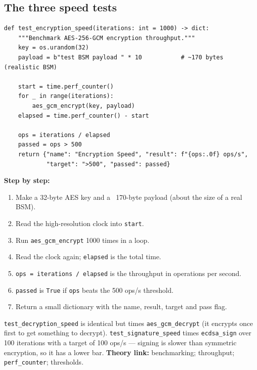 \documentclass[11pt,a4paper]{report}
\begin{document}
\subsection{The three speed tests}
\begin{lstlisting}[style=py,caption={evaluate\_security.py --- a representative speed benchmark.}]
def test_encryption_speed(iterations: int = 1000) -> dict:
    """Benchmark AES-256-GCM encryption throughput."""
    key = os.urandom(32)
    payload = b"test BSM payload " * 10           # ~170 bytes (realistic BSM)

    start = time.perf_counter()
    for _ in range(iterations):
        aes_gcm_encrypt(key, payload)
    elapsed = time.perf_counter() - start

    ops = iterations / elapsed
    passed = ops > 500
    return {"name": "Encryption Speed", "result": f"{ops:.0f} ops/s",
            "target": ">500", "passed": passed}
\end{lstlisting}
\textbf{Step by step:}
\begin{enumerate}
  \item Make a 32-byte AES key and a ~170-byte payload (about the size of a real
        BSM).
  \item Read the high-resolution clock into \texttt{start}.
  \item Run \texttt{aes\_gcm\_encrypt} 1000 times in a loop.
  \item Read the clock again; \texttt{elapsed} is the total time.
  \item \texttt{ops = iterations / elapsed} is the throughput in operations per
        second.
  \item \texttt{passed} is \texttt{True} if \texttt{ops} beats the 500 ops/s
        threshold.
  \item Return a small dictionary with the name, result, target and pass flag.
\end{enumerate}
\texttt{test\_decryption\_speed} is identical but times \texttt{aes\_gcm\_decrypt}
(it encrypts once first to get something to decrypt). \texttt{test\_signature\_speed}
times \texttt{ecdsa\_sign} over 100 iterations with a target of 100 ops/s ---
signing is slower than symmetric encryption, so it has a lower bar.
\textbf{Theory link:} benchmarking; throughput; \texttt{perf\_counter};
thresholds.
\end{document}

